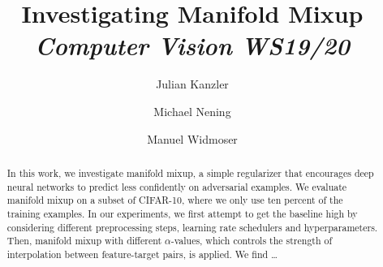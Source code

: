 \documentclass[11pt]{article}
\title{\vspace*{-3em}\huge \textbf{Investigating Manifold Mixup}\\[0.25em] \large \textit{Computer Vision WS19/20}\\[0.5em]}
\date{}
\author{
	Julian Kanzler \and
	Michael Nening \and
	Manuel Widmoser
}
\begin{document}
\maketitle

\begin{abstract}
	\noindent In this work, we investigate manifold mixup, a simple regularizer that encourages deep neural networks to predict less confidently on adversarial examples. 
    We evaluate manifold mixup on a subset of CIFAR-10, where we only use ten percent of the training examples.
    In our experiments, we first attempt to get the baseline high by considering different preprocessing steps, learning rate schedulers and hyperparameters.
    Then, manifold mixup with different $\alpha$-values, which controls the strength of interpolation between feature-target pairs, is applied.
    We find \dots
\end{abstract}







{}

\end{document}
